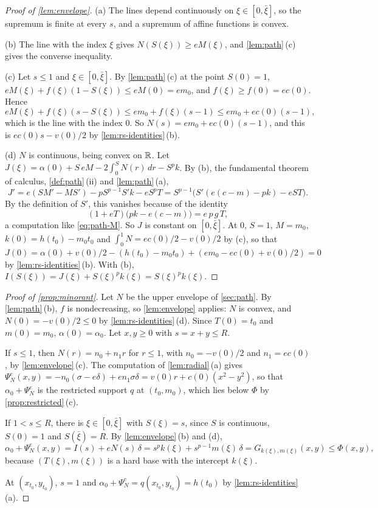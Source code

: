 \begin{proof}[Proof of \cref{lem:envelope}]
(a) The lines depend continuously on $\xi\in[0,\bar\xi]$, so the supremum is finite at every
$s$, and a supremum of affine functions is convex.

(b) The line with the index $\xi$ gives $N(S(\xi))\ge eM(\xi)$, and \cref{lem:path}\,(c) gives
the converse inequality.

(c) Let $s\le1$ and $\xi\in[0,\bar\xi]$. By \cref{lem:path}\,(c) at the point $S(0)=1$,
$eM(\xi)+f(\xi)(1-S(\xi))\le eM(0)=em_0$, and $f(\xi)\ge f(0)=ec(0)$. Hence
\[
  eM(\xi)+f(\xi)(s-S(\xi))\le em_0+f(\xi)(s-1)\le em_0+ec(0)(s-1),
\]
which is the line with the index $0$. So $N(s)=em_0+ec(0)(s-1)$, and this is
$ec(0)s-v(0)/2$ by \cref{lem:rs-identities}\,(b).

(d) $N$ is continuous, being convex on $\mathbb{R}$. Let
$J(\xi)=\alpha(0)+S\,eM-2\int_0^SN(r)\,dr-S^pk$. By (b), the fundamental theorem of calculus,
\cref{def:path}\,(ii) and \cref{lem:path}\,(a),
\[
  J'=e(SM'-MS')-pS^{p-1}S'k-eS^pT=S^{p-1}\bigl(S'(e(c-m)-pk)-eST\bigr).
\]
By the definition of $S'$, this vanishes because of the identity
\begin{equation}\label{eq:path-I}
  (1+eT)\bigl(pk-e(c-m)\bigr)=e\,p\,g\,T,
\end{equation}
a computation like \eqref{eq:path-M}. So $J$ is constant on $[0,\bar\xi]$. At $0$, $S=1$,
$M=m_0$, $k(0)=h(t_0)-m_0t_0$ and $\int_0^1N=ec(0)/2-v(0)/2$ by (c), so that
$J(0)=\alpha(0)+v(0)/2-(h(t_0)-m_0t_0)+(em_0-ec(0)+v(0)/2)=0$ by \cref{lem:rs-identities}\,(b).
With (b), $I(S(\xi))=J(\xi)+S(\xi)^pk(\xi)=S(\xi)^pk(\xi)$.
\end{proof}

\begin{proof}[Proof of \cref{prop:minorant}]
Let $N$ be the upper envelope of \cref{sec:path}. By \cref{lem:path}\,(b), $f$ is nondecreasing,
so \cref{lem:envelope} applies: $N$ is convex, and $N(0)=-v(0)/2\le0$ by
\cref{lem:rs-identities}\,(d). Since $T(0)=t_0$ and $m(0)=m_0$, $\alpha(0)=\alpha_0$. Let
$x,y\ge0$ with $s=x+y\le R$.

If $s\le1$, then $N(r)=n_0+n_1r$ for $r\le1$, with $n_0=-v(0)/2$ and $n_1=ec(0)$, by
\cref{lem:envelope}\,(c). The computation of \cref{lem:radial}\,(a) gives
$\Psi^e_N(x,y)=-n_0(\sigma-e\delta)+en_1\sigma\delta=v(0)r+c(0)(x^2-y^2)$, so that
$\alpha_0+\Psi^e_N$ is the restricted support $q$ at $(t_0,m_0)$, which lies below $\Phi$ by
\cref{prop:restricted}\,(c).

If $1<s\le R$, there is $\xi\in[0,\bar\xi]$ with $S(\xi)=s$, since $S$ is continuous, $S(0)=1$
and $S(\bar\xi)=R$. By \cref{lem:envelope}\,(b) and (d),
\[
  \alpha_0+\Psi^e_N(x,y)=I(s)+eN(s)\,\delta=s^pk(\xi)+s^{p-1}m(\xi)\,\delta
  =G_{k(\xi),m(\xi)}(x,y)\le\Phi(x,y),
\]
because $(T(\xi),m(\xi))$ is a hard base with the intercept $k(\xi)$.

At $(x_{t_0},y_{t_0})$, $s=1$ and $\alpha_0+\Psi^e_N=q(x_{t_0},y_{t_0})=h(t_0)$ by
\cref{lem:rs-identities}\,(a).
\end{proof}

